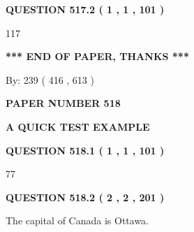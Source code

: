 \documentclass[12pt]{article}
\begin{document}
{\textbf{\Large{QUESTION
517.2 
 ( 1 , 1 , 101 )
}}}
  
  
 
 
\noindent{}

117
 
 
   
   
 \vspace{0.2in}
 
   
   
   
   
\vspace{1.0in} 
{\textbf{\large{ *** END OF PAPER, THANKS *** }}} 
   
   
\hspace{1.0in} By: 
 239 ( 416 ,  613 )
   
   
   
   
\newpage 
\setcounter{page}{ 
   518001 } 
   
   
   
   
 {\textbf{ \Large{ PAPER NUMBER  518  }}}
   
   
\vspace{0.2in}
   
   
   
   
   
   
 \vspace{0.2in}
{\LARGE {\textbf{ A QUICK TEST EXAMPLE}}}
   
   
  
\vspace{0.2in}
  
{\textbf{\Large{QUESTION
518.1 
 ( 1 , 1 , 101 )
}}}
  
  
 
 
\noindent{}

77
 
 
  
\vspace{0.2in}
  
{\textbf{\Large{QUESTION
518.2 
 ( 2 , 2 , 201 )
}}}
  
  
 
 
\noindent{}
 
 
The capital of Canada is Ottawa.
 
\end{document}
